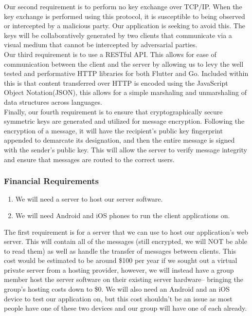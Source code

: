 \documentclass[11pt]{article}
\begin{document}
Our second requirement is to perform no key exchange over TCP/IP. When the key exchange is performed using this protocol, it is susceptible to being observed or intercepted by a malicious party. Our application is seeking to avoid this. The keys will be collaboratively generated by two clients that communicate via a visual medium that cannot be intercepted by adversarial parties.\\

Our third requirement is to use a RESTful API. This allows for ease of communication between the client and the server by allowing us to levy the well tested and performative HTTP libraries for both Flutter and Go. Included within this is that content transferred over HTTP  is encoded using the JavaScript Object Notation(JSON), this allows for a simple marshaling and unmarshaling of data structures across languages. \\

Finally, our fourth requirement is to ensure that cryptographically secure symmetric keys are generated and utilized for message encryption. Following the encryption of a message, it will have the recipient’s public key fingerprint appended to demarcate its designation, and then the entire message is signed with the sender’s public key. This will allow the server to verify message integrity and ensure that messages are routed to the correct users.\\

\subsubsection*{Financial Requirements}
\begin{enumerate}
	\item{We will need a server to host our server software.}
	\item{We will need Android and iOS phones to run the client applications on.}
\end{enumerate}
The first requirement is for a server that we can use to host our application’s web server. This will contain all of the messages (still encrypted, we will NOT be able to read them) as well as handle the transfer of messages between clients. This cost would be estimated to be around \$100 per year if we sought out a virtual private server from a hosting provider, however, we will instead have a group member host the server software on their existing server hardware–  bringing the group’s hosting costs down to \$0. We will also need an Android and an iOS device to test our application on, but this cost shouldn’t be an issue as most people have one of these two devices and our group will have one of each already.
\end{document}
